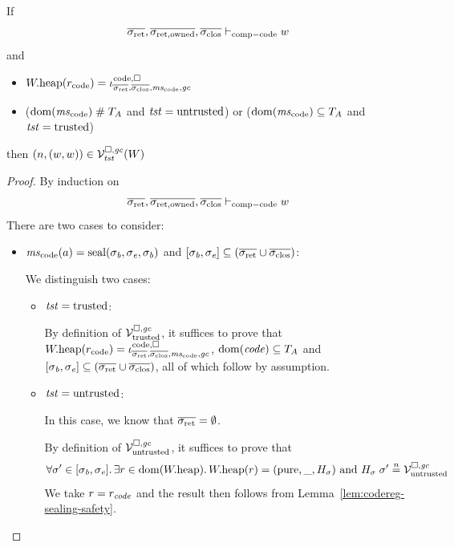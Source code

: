 \documentclass[a4paper]{article}
\begin{document}
\begin{lemma}
  \label{lem:ftlr-comp-code}
  If
  \begin{equation*}
    \sigrets,\sigrets[\mathrm{owned}],\sigcloss \vdash_{\mathrm{comp-code}} w
  \end{equation*}
  and
  \begin{itemize}
  \item $\pwheap(r_{\mathrm{code}}) = \codereg{\sigrets,\sigcloss,\mscode,\gc}$
  \item ($\dom(\mscode) \mathrel{\#} \ta$ and $\mathit{tst} = \mathrm{untrusted}$) or ($\dom(\mscode) \subseteq \ta$ and $\mathit{tst} = \mathrm{trusted}$)
  \end{itemize}

  then $\left(n,(w,w)\right) \in \mathcal{V}^{\square,\mathit{gc}}_{\mathit{tst}}(W)$
\end{lemma}
\begin{proof}
  By induction on
  \begin{equation*}
    \sigrets,\sigrets[\mathrm{owned}],\sigcloss \vdash_{\mathrm{comp-code}} w
  \end{equation*}
  There are two cases to consider:
  \begin{itemize}
  \item
    $\mscode(a) = \seal{\sigma_\baddr,\sigma_\eaddr,\sigma_\baddr}$ and $[\sigma_\baddr,\sigma_\eaddr] \subseteq (\sigrets \cup \sigcloss)$:

    We distinguish two cases:
    \begin{itemize}
    \item $\mathit{tst} = \mathrm{trusted}$:

      By definition of $\mathcal{V}^{\square,\mathit{gc}}_{\mathrm{trusted}}$, it suffices to prove that
      $\pwheap(r_{\mathrm{code}}) = \codereg{\sigrets,\sigcloss,\mscode,\gc}$, $\mathrm{dom}(\mathit{code})\subseteq T_{A}$ and $[\sigma_\baddr,\sigma_\eaddr] \subseteq (\sigrets \cup \sigcloss)$, all of which follow by assumption.

    \item $\mathit{tst} = \mathrm{untrusted}$:

      In this case, we know that $\sigrets=\emptyset$.

      By definition of $\mathcal{V}^{\square,\mathit{gc}}_{\mathrm{untrusted}}$, it suffices to prove that
      \begin{equation*}
        \forall \sigma' \in [\sigma_{\mathit{b}},\sigma_{\mathit{e}}] \ldotp \exists r \in \mathrm{dom}(W.\mathrm{heap}) \ldotp W.\mathrm{heap}(r) = (\mathrm{pure},\_,H_\sigma) \text{ and } H_\sigma \; \sigma' \overset{n}{=} \mathcal{V}^{\square,\mathit{gc}}_{\mathrm{untrusted}}
      \end{equation*}
      We take $r = r_{\mathit{code}}$ and the result then follows from Lemma~\ref{lem:codereg-sealing-safety}.
    \end{itemize}


\end{itemize}
\end{proof}
\end{document}
